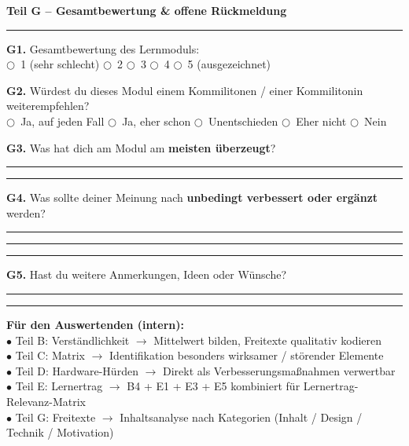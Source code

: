 \documentclass[a4paper,10pt]{article}
\newcommand{\radio}{\textsf{\Large$\bigcirc$}}
\newcommand{\linefill}{\rule{\linewidth}{0.4pt}\vspace{1.2ex}}
\begin{document}
\vspace{8pt}

{\large \bfseries \color{primary} Teil G – Gesamtbewertung \& offene Rückmeldung}\\[-4pt]
\color{accent}\rule{\linewidth}{1.5pt}\color{black}\vspace{4pt}

\textbf{G1.} Gesamtbewertung des Lernmoduls:\\
\radio~1 (sehr schlecht) \quad \radio~2 \quad \radio~3 \quad \radio~4 \quad \radio~5 (ausgezeichnet)

\vspace{5pt}
\textbf{G2.} Würdest du dieses Modul einem Kommilitonen / einer Kommilitonin weiterempfehlen?\\
\radio~Ja, auf jeden Fall \quad \radio~Ja, eher schon \quad \radio~Unentschieden \quad \radio~Eher nicht \quad \radio~Nein

\vspace{5pt}
\textbf{G3.} Was hat dich am Modul am \textbf{meisten überzeugt}?\\
\linefill
\linefill

\vspace{5pt}
\textbf{G4.} Was sollte deiner Meinung nach \textbf{unbedingt verbessert oder ergänzt} werden?\\
\linefill
\linefill
\linefill

\vspace{5pt}
\textbf{G5.} Hast du weitere Anmerkungen, Ideen oder Wünsche?\\
\linefill
\linefill

\vspace{10pt}

\vspace{12pt}
\begin{tcolorbox}[colback=lightgray,colframe=gray,arc=1mm,boxrule=0.5pt,top=4pt,bottom=4pt,left=6pt,right=6pt]
\small \textbf{Für den Auswertenden (intern):}\\
$\bullet$ Teil B: Verständlichkeit $\rightarrow$ Mittelwert bilden, Freitexte qualitativ kodieren\\
$\bullet$ Teil C: Matrix $\rightarrow$ Identifikation besonders wirksamer / störender Elemente\\
$\bullet$ Teil D: Hardware-Hürden $\rightarrow$ Direkt als Verbesserungsmaßnahmen verwertbar\\
$\bullet$ Teil E: Lernertrag $\rightarrow$ B4 + E1 + E3 + E5 kombiniert für Lernertrag-Relevanz-Matrix\\
$\bullet$ Teil G: Freitexte $\rightarrow$ Inhaltsanalyse nach Kategorien (Inhalt / Design / Technik / Motivation)
\end{tcolorbox}
\end{document}
